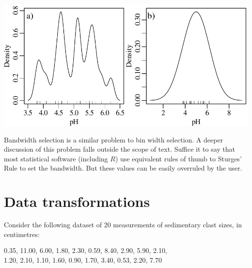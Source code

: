 \noindent\begin{minipage}[t][][b]{.55\textwidth}
  \includegraphics[width=\textwidth]{../figures/bandwidth.pdf}\medskip
\end{minipage}
\begin{minipage}[t][][t]{.45\textwidth}
\end{minipage}

Bandwidth selection is a similar problem to bin width selection.  A
deeper discussion of this problem falls outside the scope of text.
Suffice it to say that most statistical software (including $R$) use
equivalent rules of thumb to Sturges' Rule to set the bandwidth.  But
these values can be easily overruled by the user.

\section{Data transformations}
\label{sec:transformations}

Consider the following dataset of 20 measurements of sedimentary
clast sizes, in centimetres:

\begin{center}
0.35, 11.00, 6.00, 1.80, 2.30, 0.59, 8.40, 2.90, 5.90, 2.10,\\
1.20, 2.10, 1.10, 1.60, 0.90, 1.70, 3.40, 0.53, 2.20, 7.70
\end{center}

